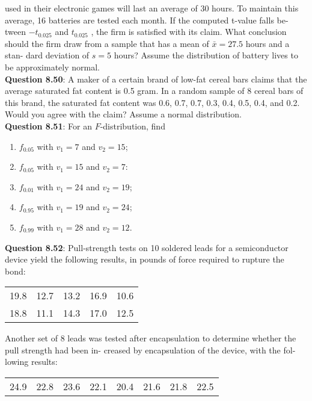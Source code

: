 \documentclass{article}
\begin{document}
    used in their electronic games will last an average of
    30 hours. To maintain this average, 16 batteries are
    tested each month. If the computed t-value falls be-
    tween $-t_{0.025}$ and $t_{0.025}$ , the firm is satisfied with its
    claim. What conclusion should the firm draw from a
    sample that has a mean of $\bar{x} = 27.5$ hours and a stan-
    dard deviation of $s = 5$ hours? Assume the distribution
    of battery lives to be approximately normal.\\\newline
    \textbf{Question 8.50}: A maker of a certain brand of low-fat cereal bars
    claims that the average saturated fat content is 0.5
    gram. In a random sample of 8 cereal bars of this
    brand, the saturated fat content was 0.6, 0.7, 0.7, 0.3,
    0.4, 0.5, 0.4, and 0.2. Would you agree with the claim?
    Assume a normal distribution.\\\newline
    \textbf{Question 8.51}: For an $F$-distribution, find
        \begin{enumerate}[label = (\alph*) ]
            \item $f_{0.05}$ with $v_1 = 7$ and $v_2 = 15$;
            \item $f_{0.05}$ with $v_1 = 15$ and $v_2 = 7$:
            \item $f_{0.01}$ with $v_1 = 24$ and $v_2 = 19$;
            \item $f_{0.95}$ with $v_1 = 19$ and $v_2 = 24$;
            \item $f_{0.99}$ with $v_1 = 28$ and $v_2 = 12$.
        \end{enumerate}
    \textbf{Question 8.52}: Pull-strength tests on 10 soldered leads for a
    semiconductor device yield the following results, in
    pounds of force required to rupture the bond:
        \begin{center}
            \begin{tabular}{c c c c c}
                19.8 & 12.7 & 13.2 & 16.9 & 10.6 \\
                18.8 & 11.1 & 14.3 & 17.0 & 12.5
            \end{tabular}
        \end{center}
    Another set of 8 leads was tested after encapsulation
    to determine whether the pull strength had been in-
    creased by encapsulation of the device, with the fol-
    lowing results:
        \begin{center}
            \begin{tabular}{c c c c c c c c}
                24.9 & 22.8 & 23.6 & 22.1 & 20.4 & 21.6 & 21.8 & 22.5
            \end{tabular}
        \end{center}
\end{document}
